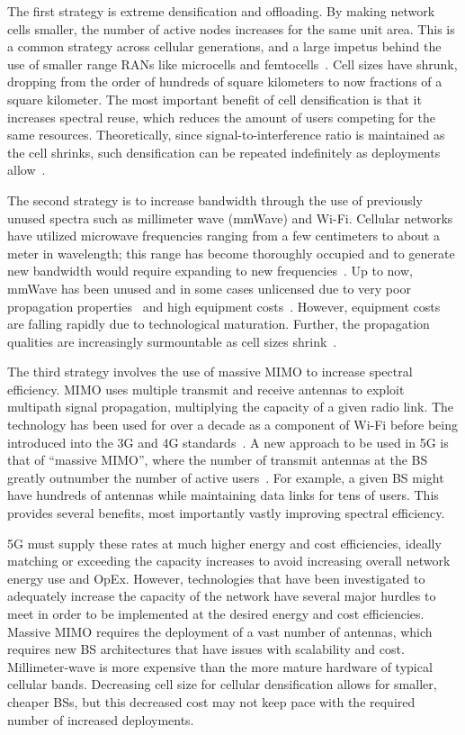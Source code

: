 \documentclass[12pt,dvipsnames]{report}
\begin{document}
The first strategy is extreme densification and offloading.  By making network cells smaller, the number of active nodes increases for the same unit area.  This is a common strategy across cellular generations, and a large impetus behind the use of smaller range RANs like microcells and femtocells~\cite{4623708}.  Cell sizes have shrunk, dropping from the order of hundreds of square kilometers to now fractions of a square kilometer.  The most important benefit of cell densification is that it increases spectral reuse, which reduces the amount of users competing for the same resources.  Theoretically, since signal-to-interference ratio is maintained as the cell shrinks, such densification can be repeated indefinitely as deployments allow~\cite{6824752, 6171996}.

The second strategy is to increase bandwidth through the use of previously unused spectra such as millimeter wave (mmWave) and Wi-Fi.  Cellular networks have utilized microwave frequencies ranging from a few centimeters to about a meter in wavelength; this range has become thoroughly occupied and to generate new bandwidth would require expanding to new frequencies~\cite{FCC:NationalBroadbandPlan,ITU:M2078}.  Up to now, mmWave has been unused and in some cases unlicensed due to very poor propagation properties~\cite{1491267,5783993} and high equipment costs~\cite{5783993}.  However, equipment costs are falling rapidly due to technological maturation.  Further, the propagation qualities are increasingly surmountable as cell sizes shrink~\cite{6515173}.

The third strategy involves the use of massive MIMO to increase spectral efficiency.  MIMO uses multiple transmit and receive antennas to exploit multipath signal propagation, multiplying the capacity of a given radio link.  The technology has been used for over a decade as a component of Wi-Fi before being introduced into the 3G and 4G standards~\cite{6824752}.  A new approach to be used in 5G is that of ``massive MIMO'', where the number of transmit antennas at the BS greatly outnumber the number of active users~\cite{5595728}.  For example, a given BS might have hundreds of antennas while maintaining data links for tens of users.  This provides several benefits, most importantly vastly improving spectral efficiency.

5G must supply these rates at much higher energy and cost efficiencies, ideally matching or exceeding the capacity increases to avoid increasing overall network energy use and OpEx.  However, technologies that have been investigated to adequately increase the capacity of the network have several major hurdles to meet in order to be implemented at the desired energy and cost efficiencies.  Massive MIMO requires the deployment of a vast number of antennas, which requires new BS architectures that have issues with scalability and cost.  Millimeter-wave is more expensive than the more mature hardware of typical cellular bands.  Decreasing cell size for cellular densification allows for smaller, cheaper BSs, but this decreased cost may not keep pace with the required number of increased deployments.~\cite{6824752}
\end{document}
